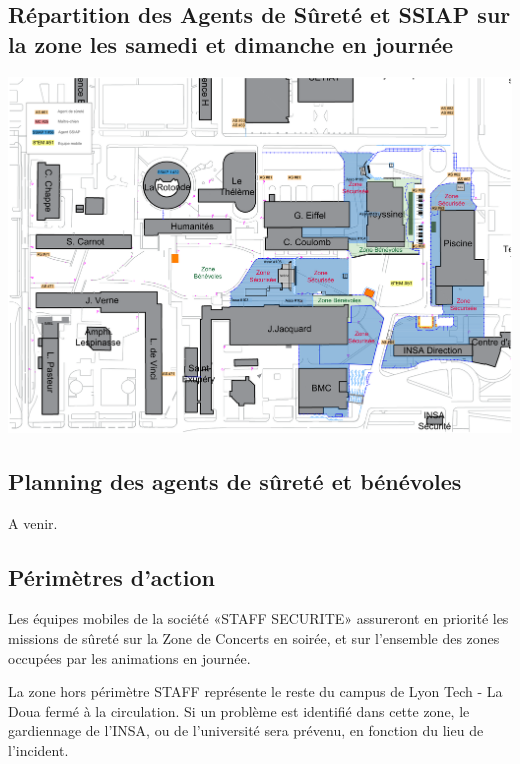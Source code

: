 \documentclass[hidelinks, paper=a4, fontsize=13pt]{report}
\begin{document}
\subsection{Répartition des Agents de Sûreté et SSIAP sur la zone les samedi et dimanche en journée}
\label{refRepartitionAgentsDeSureteJournee}
\begin{center}
	\includegraphics[width=\textwidth,keepaspectratio, angle=90]{Exports/Plan_24h_44eme-AS_Jour}
\end{center}


\subsection{Planning des agents de sûreté et bénévoles}
\label{refPlanningDesAgentsDeSurete}
A venir.
\label{planning_as}


\subsection{Périmètres d’action}

Les équipes mobiles de la société «STAFF SECURITE» assureront en priorité les missions de sûreté sur la Zone de Concerts en soirée, et sur l’ensemble des zones occupées par les animations en journée. 

La zone hors périmètre STAFF représente le reste du campus de Lyon Tech - La Doua fermé à la circulation. Si un problème est identifié dans cette zone, le gardiennage de l’INSA, ou de l’université sera prévenu, en fonction du lieu de l’incident.
\end{document}
